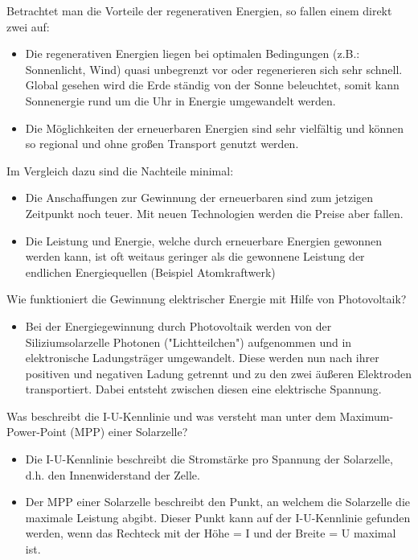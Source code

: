 Betrachtet man die Vorteile der regenerativen Energien, so fallen einem direkt zwei auf: \cite{focus_procontra}
\begin{itemize}
\item Die regenerativen Energien liegen bei optimalen Bedingungen (z.B.: Sonnenlicht, Wind) quasi unbegrenzt vor oder regenerieren sich sehr schnell. Global gesehen wird die Erde ständig von der Sonne beleuchtet, somit kann Sonnenergie rund um die Uhr in Energie umgewandelt werden.
\item Die Möglichkeiten der erneuerbaren Energien sind sehr vielfältig und können so regional und ohne großen Transport genutzt werden.
\end{itemize}

Im Vergleich dazu sind die Nachteile minimal: \cite{focus_procontra}
\begin{itemize}
\item Die Anschaffungen zur Gewinnung der erneuerbaren sind zum jetzigen Zeitpunkt noch teuer. Mit neuen Technologien werden die Preise aber fallen.
\item Die Leistung und Energie, welche durch erneuerbare Energien gewonnen werden kann, ist oft weitaus geringer als die gewonnene Leistung der endlichen Energiequellen (Beispiel Atomkraftwerk)
\end{itemize}

Wie funktioniert die Gewinnung elektrischer Energie mit Hilfe von Photovoltaik?
\begin{itemize}
\item Bei der Energiegewinnung durch Photovoltaik werden von der Siliziumsolarzelle Photonen ("Lichtteilchen") aufgenommen und in elektronische Ladungsträger umgewandelt. Diese werden nun nach ihrer positiven und negativen Ladung getrennt und zu den zwei äußeren Elektroden transportiert. Dabei entsteht zwischen diesen eine elektrische Spannung. \cite{weltderphysik}
\end{itemize}

Was beschreibt die I-U-Kennlinie und was versteht man unter dem Maximum-Power-Point (MPP) einer Solarzelle?
\begin{itemize}
\item Die I-U-Kennlinie beschreibt die Stromstärke pro Spannung der Solarzelle, d.h. den Innenwiderstand der Zelle.
\item Der MPP einer Solarzelle beschreibt den Punkt, an welchem die Solarzelle die maximale Leistung abgibt. Dieser Punkt kann auf der I-U-Kennlinie gefunden werden, wenn das Rechteck mit der Höhe = I und der Breite = U maximal ist. \cite{Fachkundebuch}
\end{itemize}

